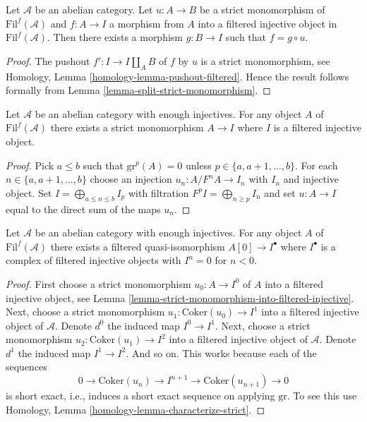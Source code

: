 \begin{lemma}
\label{lemma-injective-property-filtered-injective}
Let $\mathcal{A}$ be an abelian category. 
Let $u : A \to B$ be a strict monomorphism
of $\text{Fil}^f(\mathcal{A})$
and $f : A \to I$ a morphism from $A$ into a filtered injective object
in $\text{Fil}^f(\mathcal{A})$.
Then there exists a morphism $g : B \to I$ such that $f = g \circ u$.
\end{lemma}

\begin{proof}
The pushout $f' : I \to I \amalg_A B$ of $f$ by $u$ is a strict
monomorphism, see
Homology, Lemma \ref{homology-lemma-pushout-filtered}.
Hence the result follows formally from
Lemma \ref{lemma-split-strict-monomorphism}.
\end{proof}

\begin{lemma}
\label{lemma-strict-monomorphism-into-filtered-injective}
Let $\mathcal{A}$ be an abelian category with enough injectives.
For any object $A$ of $\text{Fil}^f(\mathcal{A})$ there exists
a strict monomorphism $A \to I$
where $I$ is a filtered injective object.
\end{lemma}

\begin{proof}
Pick $a \leq b$ such that $\text{gr}^p(A) = 0$ unless
$p \in \{a, a + 1, \ldots, b\}$. For each
$n \in \{a, a + 1, \ldots, b\}$ choose an injection
$u_n : A/F^nA \to I_n$ with $I_n$ and injective object.
Set $I = \bigoplus_{a \leq n \leq b} I_p$ with filtration
$F^pI = \bigoplus_{n \geq p} I_n$ and set $u : A \to I$ equal to
the direct sum of the maps $u_n$.
\end{proof}

\begin{lemma}
\label{lemma-filtered-injective-right-resolution-single-object}
Let $\mathcal{A}$ be an abelian category with enough injectives.
For any object $A$ of $\text{Fil}^f(\mathcal{A})$ there exists
a filtered quasi-isomorphism $A[0] \to I^\bullet$
where $I^\bullet$ is a complex of filtered injective objects
with $I^n = 0$ for $n < 0$.
\end{lemma}

\begin{proof}
First choose a strict monomorphism $u_0 : A \to I^0$ of $A$ into a filtered
injective object, see
Lemma \ref{lemma-strict-monomorphism-into-filtered-injective}.
Next, choose a strict monomorphism
$u_1 : \text{Coker}(u_0) \to I^1$ into a filtered injective object of
$\mathcal{A}$. Denote $d^0$ the induced map $I^0 \to I^1$.
Next, choose a strict monomorphism $u_2 : \text{Coker}(u_1) \to I^2$ into
a filtered injective object of $\mathcal{A}$. Denote $d^1$ the induced
map $I^1 \to I^2$. And so on. This works because each
of the sequences
$$
0 \to \text{Coker}(u_n) \to I^{n + 1} \to \text{Coker}(u_{n + 1}) \to 0
$$
is short exact, i.e., induces a short exact sequence on applying
$\text{gr}$. To see this use
Homology, Lemma \ref{homology-lemma-characterize-strict}.
\end{proof}

